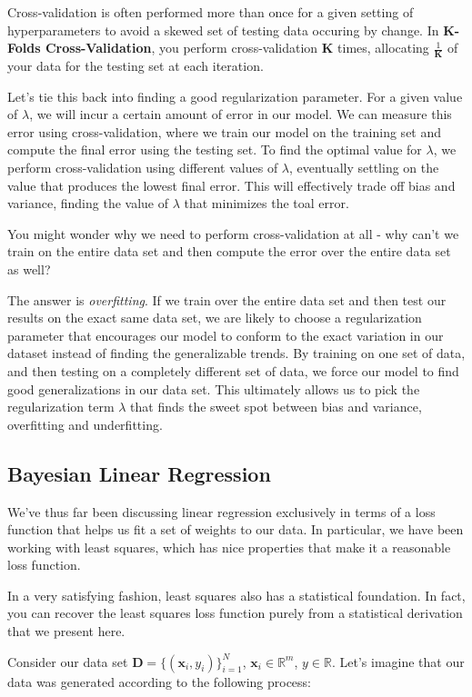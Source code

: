 Cross-validation is often performed more than once for a given setting of hyperparameters to avoid a skewed set of testing data occuring by change. In \textbf{K-Folds Cross-Validation}, you perform cross-validation \textbf{K} times, allocating $\frac{1}{\textbf{K}}$ of your data for the testing set at each iteration.

Let's tie this back into finding a good regularization parameter. For a given value of $\lambda$, we will incur a certain amount of error in our model. We can measure this error using cross-validation, where we train our model on the training set and compute the final error using the testing set. To find the optimal value for $\lambda$, we perform cross-validation using different values of $\lambda$, eventually settling on the value that produces the lowest final error. This will effectively trade off bias and variance, finding the value of $\lambda$ that minimizes the toal error.

You might wonder why we need to perform cross-validation at all - why can't we train on the entire data set and then compute the error over the entire data set as well?

The answer is \textit{overfitting}. If we train over the entire data set and then test our results on the exact same data set, we are likely to choose a regularization parameter that encourages our model to conform to the exact variation in our dataset instead of finding the generalizable trends. By training on one set of data, and then testing on a completely different set of data, we force our model to find good generalizations in our data set. This ultimately allows us to pick the regularization term $\lambda$ that finds the sweet spot between bias and variance, overfitting and underfitting.

\subsection{Bayesian Linear Regression}
We've thus far been discussing linear regression exclusively in terms of a loss function that helps us fit a set of weights to our data. In particular, we have been working with least squares, which has nice properties that make it a reasonable loss function.

In a very satisfying fashion, least squares also has a statistical foundation. In fact, you can recover the least squares loss function purely from a statistical derivation that we present here.

Consider our data set $\textbf{D} = \{(\textbf{x}_{i}, y_{i})\}_{i = 1}^{N}$, $\textbf{x}_{i} \in\mathbb{R}^m$, $y \in\mathbb{R}$. Let's imagine that our data was generated according to the following process:

